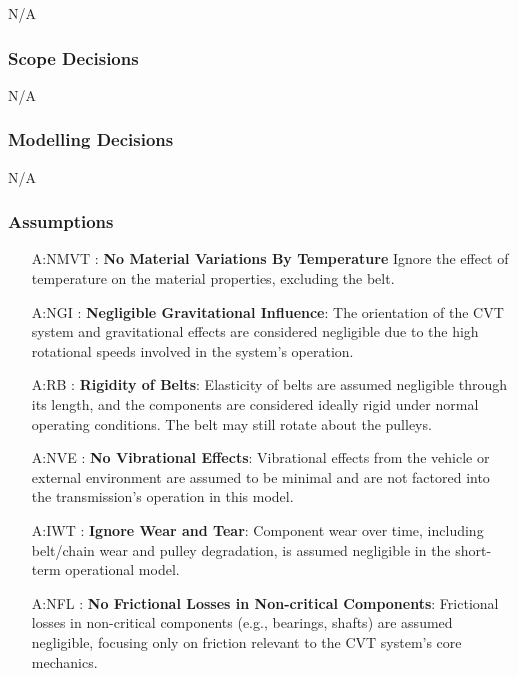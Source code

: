 \documentclass[12pt]{article}
\begin{document}
N/A

\subsubsection{Scope Decisions}

N/A
\subsubsection{Modelling Decisions}

N/A

\subsubsection{Assumptions} \label{sec_assumpt}

\begin{itemize}

\item[A:NMVT \label{A:NMVT}:]
\textbf{No Material Variations By Temperature } Ignore the effect of temperature on the material properties, excluding the belt.

\item[A:NGI \label{A:NGI}:]
\textbf{Negligible Gravitational Influence}: The orientation of the CVT system and gravitational effects are considered negligible due to the high rotational speeds involved in the system's operation.

\item[A:RB \label{A:RB}:]
\textbf{Rigidity of Belts}: Elasticity of belts are assumed negligible through its length, and the components are considered ideally rigid under normal operating conditions. The belt may still rotate about the pulleys.

\item[A:NVE \label{A:NVE}:]
\textbf{No Vibrational Effects}: Vibrational effects from the vehicle or external environment are assumed to be minimal and are not factored into the transmission’s operation in this model.

\item[A:IWT \label{A:IWT}:]
\textbf{Ignore Wear and Tear}: Component wear over time, including belt/chain wear and pulley degradation, is assumed negligible in the short-term operational model.

\item[A:NFL \label{A:NFL}:]
\textbf{No Frictional Losses in Non-critical Components}: Frictional losses in non-critical components (e.g., bearings, shafts) are assumed negligible, focusing only on friction relevant to the CVT system's core mechanics.


\end{itemize}
\end{document}
